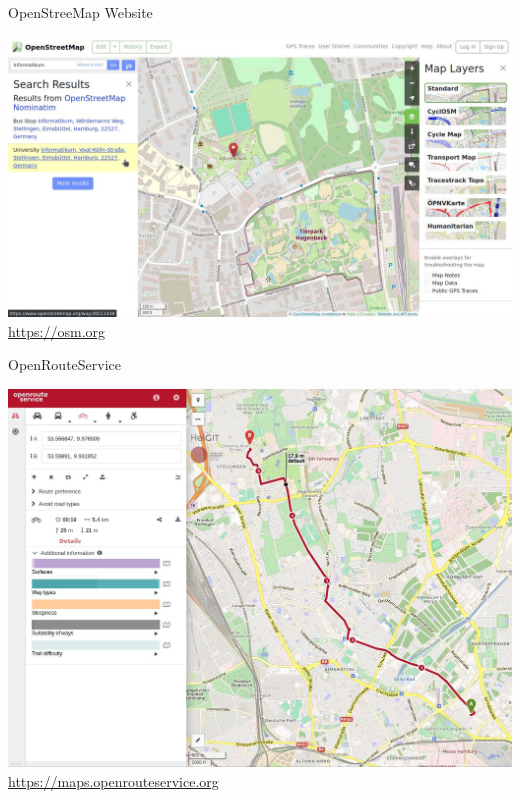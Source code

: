 \documentclass{beamer}
\begin{document}
			\begin{frame}{OpenStreeMap Website}
				\begin{center}
					\includegraphics[height=0.7\textheight]{images/osm-website.jpg}\\
					\url{https://osm.org}
				\end{center}
			\end{frame}
			
			\begin{frame}{OpenRouteService}
				\begin{center}
					\includegraphics[height=0.7\textheight]{images/openrouteservice.jpg}\\
					\url{https://maps.openrouteservice.org}
				\end{center}
			\end{frame}
			
\end{document}
